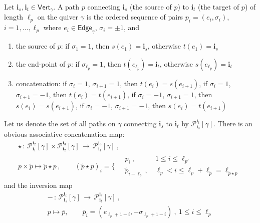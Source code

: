 \documentclass[12pt]{amsart}
\newcommand {\3}{\underline{\bf 3}}
\newcommand {\4}{\underline{\bf 4}}
\newcommand {\6}{\underline{\bf 6}}
\newcommand {\ib} {\mathbf{i}}
\newcommand {\CalP} {\mathcal P}
\newcommand{\Vg}{\mathsf{Vert}_{\gamma}}
\newcommand{\Eg}{\mathsf{Edge}_{\gamma}}
\newcommand{\subsubsec}[1]{\subsubsection{\uwave{\sl #1}}}
\begin{document}
Let ${\ib}_{s}, {\ib}_{t} \in {\Vg}$. 
A path $p$ connecting ${\ib}_{s}$ (the source of $p$) to
${\ib}_{t}$ (the target of $p$) of length ${\ell}_{p}$
on the quiver 
$\gamma$ is the ordered sequence of pairs
$p_{i} = (e_{i}, {\sigma}_{i})$, $i = 1, \ldots , {\ell}_{p}$   
where $e_{i} \in {\Eg}$, ${\sigma}_{i} = \pm 1$, and
\begin{enumerate}
\item the source of $p$: if ${\sigma}_{1} = 1$, then $s(e_{1}) = {\ib}_{s}$, otherwise $t(e_{1}) = {\ib}_{s}$
\item the end-point of $p$: if ${\sigma}_{{\ell}_{p}} = 1$, then 
$t(e_{{\ell}_{p}}) = {\ib}_{t}$, otherwise $s(e_{{\ell}_{p}}) = {\ib}_{t}$
\item concatenation: if ${\sigma}_{i} = 1$, ${\sigma}_{i+1} = 1$, then 
$t(e_{i}) = s(e_{i+1})$, if ${\sigma}_{i} = 1$, ${\sigma}_{i+1} = -1$, then 
$t(e_{i}) = t(e_{i+1})$, if ${\sigma}_{i} = -1$, ${\sigma}_{i+1} = 1$, then 
$s(e_{i}) = s(e_{i+1})$, if ${\sigma}_{i} = -1$, ${\sigma}_{i+1} = -1$, then 
$s(e_{i}) = t(e_{i+1})$
\end{enumerate}
Let us denote the set of all paths on $\gamma$ connecting ${\ib}_{s}$ to ${\ib}_{t}$
by ${\CalP}_{{\ib}_{s}}^{{\ib}_{t}}[{\gamma}]$. There is an obvious associative concatenation
map:
\begin{multline}
\star \, : \, {\CalP}_{{\ib}_{1}}^{{\ib}_{2}}[{\gamma}] \times 
{\CalP}_{{\ib}_{2}}^{{\ib}_{3}}[{\gamma}] \, \longrightarrow \, {\CalP}_{{\ib}_{1}}^{{\ib}_{3}}[{\gamma}] \ , \\
p \times {\tilde p} \mapsto {\tilde p} \star p\, , \qquad
\left( {\tilde p} \star p  \right)_{i} = \Biggl\{ \begin{matrix} & \ p_{i} \ , & \ 1 \leq i \leq {\ell}_{p'}  \\
& \ {\tilde p}_{i-{\ell}_{p}} \  , & \ {\ell}_{p} < i \leq {\ell}_{p} + {\ell}_{\tilde p} = {\ell}_{{\tilde p} \star p} \end{matrix}
\end{multline}
and the inversion map 
\begin{multline}
- \, : \, {\CalP}_{{\ib}_{s}}^{{\ib}_{t}}[{\gamma}] \, \longrightarrow \, {\CalP}_{{\ib}_{t}}^{{\ib}_{s}}[{\gamma}] \ , \\
p \mapsto {\bar p}  , \qquad
{\bar p}_{i} = \left( e_{{\ell}_{p}+1-i} , - {\sigma}_{{\ell}_{p}+1-i} \right)  \ ,  \ 1 \leq i \leq {\ell}_{p}
\end{multline}

\subsubsec{Nakajima varieties}
\end{document}
